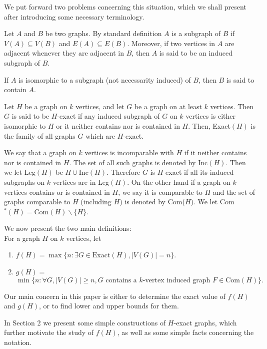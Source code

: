 \documentclass[a4paper,12pt]{article}
\begin{document}
We put forward two problems concerning this situation, which we shall present after introducing some necessary terminology.

Let $A$ and $B$ be two graphs.
By standard definition $A$ is a subgraph of $B$ if $V(A)\subseteq V(B)$ and $E(A) \subseteq E(B)$. Moreover, if two vertices in $A$ are adjacent whenever they are adjacent in $B$, then $A$ is said to be an induced subgraph of $B$.
	
If $A$ is isomorphic to a subgraph (not necessarity induced) of $B$, then $B$ is said to contain $A$. 

Let $H$ be a graph on $k$ vertices, and let $G$ be a graph on at least $k$ vertices. Then $G$ is said to be $H$-exact if any induced subgraph of $G$ on $k$ vertices is either isomorphic to $H$ or it neither contains nor is contained in $H$. Then, Exact$(H)$ is the family of all graphs $G$ which are $H$-exact.

We say that  a graph on $k$ vertices is incomparable with $H$ if it neither contains nor is contained in $H$. The set of all such graphs is denoted by Inc$(H)$. Then we let Leg$(H)$ be $H\cup \mbox{Inc}(H)$. Therefore $G$ is $H$-exact if all its induced subgraphs on $k$ vertices are in Leg$(H)$.  On the other hand if a graph on $k$ vertices contains or is contained in $H$, we say it is comparable to $H$ and the set of graphs comparable to $H$ (including $H$) is denoted by Com($H$).  We let Com$^*(H)= \text{Com}(H) \backslash \{H\}$.

We now present the two main definitions:\\
 
For a graph $H$ on $k$ vertices, let 
\begin{enumerate}
\item{$f(H) = \max\{ n : \exists G \in \text{Exact}(H), |V(G)| = n \}$.}
\item{$g(H) =$ \[\min\{ n : \forall G, |V(G)| \geq n, G\text{ contains a } k \text{-vertex induced graph } F \in \text{Com}(H) \}.\]}
\end{enumerate}

Our main concern in this paper  is either to determine the exact value of $f(H)$ and $g(H)$, or to find lower and upper bounds for them.



In Section 2 we present some simple constructions of $H$-exact graphs, which further motivate the study of $f(H)$, as well as some simple facts concerning the notation.
\end{document}
